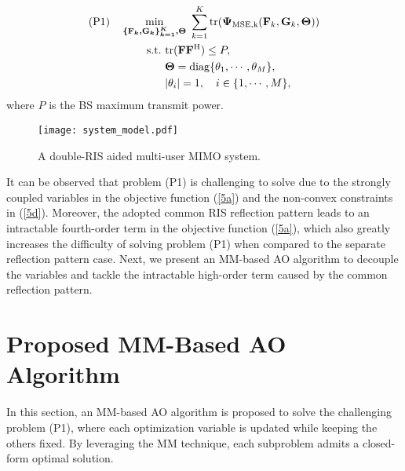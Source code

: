\documentclass[journal]{IEEEtran}
\begin{document}
\vspace{-5mm}
\begin{subequations}\begin{align}\text {(P1)} &\quad \min _{\boldsymbol{ \{ {\mathbf{F}}_{k} , {\mathbf{G}}_{k} \}_{k=1}^{K},{\Theta } }}~ \sum _{k = 1}^{K}{\mathrm {tr}} ({\boldsymbol {\Psi }_{\mathrm{ MSE,k}} ({\mathbf{F}_{k}}, {\mathbf{G}_{k}},\boldsymbol {\Theta  }) } )\label{5a}
\\&\qquad \quad ~\text {s.t.}~
     {\mathrm {tr}} ( {\mathbf{F}} {\mathbf{F}}^{\mathrm {H}})\le P, \label{5b}
     \\&\hphantom {\qquad \quad ~\text {s.t.}~} 
       \boldsymbol {\Theta }= \mathop {\mathrm {diag}}\nolimits \{\theta  _{1},\cdots,\theta  _{M}\},\label{5c}
       \\&\hphantom {\qquad \quad ~\text {s.t.}~} |\theta  _{{i}}|=1, \quad i\in \{1,\cdots,M\},\label{5d}
     \end{align}  \end{subequations}    
where ${P}$ is the BS maximum transmit power.
\begin{figure}[htbp]
    \centering
    \texttt{[image: system\_model.pdf]}
    \caption{A double-RIS aided multi-user MIMO system.}
    \label{fig_1}
    \end{figure}
It can be observed that problem (P1) is challenging to solve due to
the strongly coupled variables in the objective function (\ref{5a}) and
the non-convex  constraints in (\ref{5d}).
Moreover, the adopted common RIS reflection pattern leads to an intractable fourth-order term in the objective function (\ref{5a}), which also greatly increases the difficulty of solving problem (P1) when compared to the separate reflection pattern case. Next, we present an MM-based AO algorithm 
to decouple the variables and tackle the intractable high-order term caused by the common reflection pattern.

\vspace{-2.5mm}

\section{Proposed MM-Based AO Algorithm }
In this section,  an MM-based AO algorithm is proposed to solve the challenging problem (P1), where each optimization variable is updated while keeping the others fixed. By leveraging the MM technique, each subproblem admits a closed-form optimal solution. 
\end{document}
